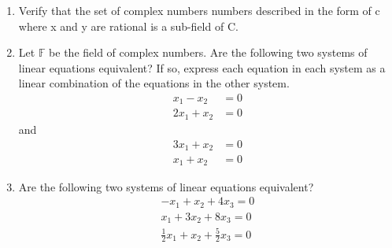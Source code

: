 \renewcommand{\theequation}{\theenumi}
\renewcommand{\thefigure}{\theenumi}
\begin{enumerate}[label=\thesubsection.\arabic*.,ref=\thesubsection.\theenumi]
%
\item  Verify that the set of complex numbers numbers described in the form of c where x and y are rational is a sub-field of C.
\\
\solution

\item Let $\mathbb{F}$ be the field of complex numbers. Are the following two systems of linear equations equivalent? If so, express each equation in each system as a linear combination of the equations in the other system.
\begin{align*}
    x_1 - x_2 &=0\\
    2x_1 + x_2 &=0
\end{align*}
and 
\begin{align*}
    3x_1 + x_2 &=0 \\
    x_1 + x_2 &=0
\end{align*}
%
\solution


\item Are the following two systems of linear equations equivalent?
\begin{equation} \label{eq:solutions/1/1/3/eq:eq1}
\begin{split}
    -x_1+x_2+4x_3=0\\
    x_1+3x_2+8x_3=0\\
    \frac{1}{2}x_1+x_2+\frac{5}{2}x_3=0
\end{split}
\end{equation}
\solution



\end{enumerate}
